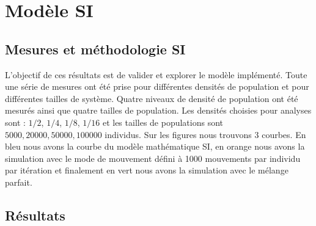 \chapter{Modèle SI} \label{ch:SI}

\section{Mesures et méthodologie SI}

L'objectif de ces résultats est de valider et explorer le modèle implémenté. Toute une série de mesures ont été prise pour différentes densités de population et pour différentes tailles de système. Quatre niveaux de densité de population ont été mesurés ainsi que quatre tailles de population. Les densités choisies pour analyses sont : $1/2$, $1/4$, $1/8$, $1/16$ et les tailles de populations sont $5000,20000,50000,100000$ individus. Sur les figures nous trouvons $3$ courbes. En bleu nous avons la courbe du modèle mathématique SI, en orange nous avons la simulation avec le mode de mouvement défini à 1000 mouvements par individu par itération et finalement en vert nous avons la simulation avec le mélange parfait.

\newpage

\section{Résultats}

